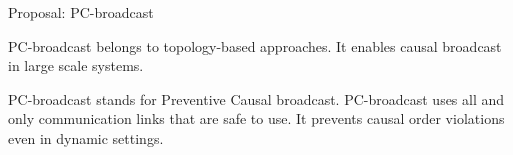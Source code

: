 \documentclass[10pt, xcolor={usenames, dvipsnames}]{beamer}
\newcommand{\xmark}{\ding{55}}
\newcommand{\NO}[1]{\textcolor{red}{#1}}
\begin{document}
\begin{frame}{Proposal: PC-broadcast}  

  PC-broadcast belongs to topology-based approaches. It enables causal broadcast
  in large scale systems.

  \vspace{2em}

  PC-broadcast stands for Preventive Causal broadcast. PC-broadcast uses all
  and only communication links that are safe to use. It prevents causal order
  violations even in dynamic settings.

\end{frame}




%       
%       
%       

  


\end{document}
